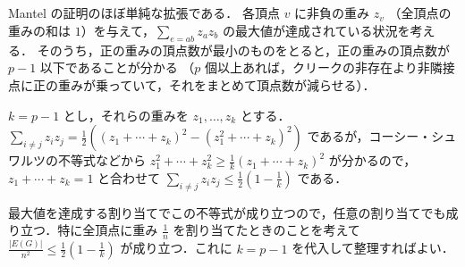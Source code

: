 \subsection{}
Mantel の証明のほぼ単純な拡張である．
各頂点 $v$ に非負の重み $z_v$ （全頂点の重みの和は $1$）を与えて，$\sum_{e=ab}z_az_b$ の最大値が達成されている状況を考える．
そのうち，正の重みの頂点数が最小のものをとると，正の重みの頂点数が $p-1$ 以下であることが分かる
（$p$ 個以上あれば，クリークの非存在より非隣接点に正の重みが乗っていて，それをまとめて頂点数が減らせる）．

$k = p-1$ とし，それらの重みを $z_1,\ldots,z_k$ とする．
$\sum_{i\neq j}z_iz_j = \frac12((z_1+\cdots+z_k)^2 - (z_1^2+\cdots+z_k)^2)$ であるが，コーシー・シュワルツの不等式などから
$z_1^2+\cdots+z_k^2 \geq \frac{1}{k}(z_1+\cdots+z_k)^2$ が分かるので，$z_1+\cdots+z_k=1$ と合わせて $\sum_{i\neq j}z_iz_j \leq \frac12(1-\frac{1}{k})$ である．

最大値を達成する割り当てでこの不等式が成り立つので，任意の割り当てでも成り立つ．特に全頂点に重み $\frac{1}{n}$ を割り当てたときのことを考えて
$\frac{|E(G)|}{n^2}\leq \frac{1}{2}(1-\frac{1}{k})$ が成り立つ．これに $k=p-1$ を代入して整理すればよい．